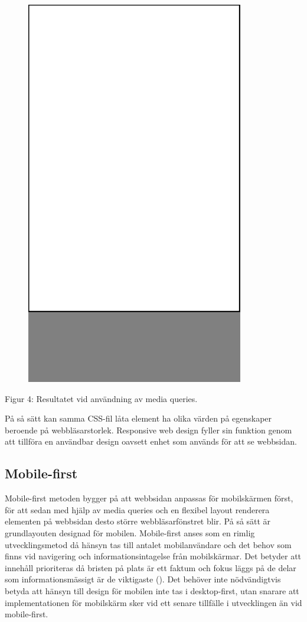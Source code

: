 \documentclass[11pt]{article}
\begin{document}
\vspace{1cm}
\begin{figure}[h]
\centerline{%
\includegraphics[scale=0.25]{pics/mobilesmall.png}
}
\end{figure}
\centerline{Figur 4: Resultatet vid användning av media queries.}
\vspace{0.5cm}

På så sätt kan samma CSS-fil låta element ha olika värden på egenskaper beroende på webbläsarstorlek. Responsive web design fyller sin funktion genom att tillföra en användbar design oavsett enhet som används för att se webbsidan. 
\newpage

\subsection{Mobile-first}
Mobile-first metoden bygger på att webbsidan anpassas för mobilskärmen först, för att sedan med hjälp av media queries och en flexibel layout renderera elementen på webbsidan desto större webbläsarfönstret blir.  På så sätt är grundlayouten designad för mobilen. Mobile-first anses som en rimlig utvecklingsmetod då hänsyn tas till antalet mobilanvändare och det behov som finns vid navigering och informationsintagelse från mobilskärmar.  Det betyder att innehåll prioriteras då bristen på plats är ett faktum och fokus läggs på de delar som informationsmässigt är de viktigaste (\cite{Mobilefirst}). Det behöver inte nödvändigtvis betyda att hänsyn till design för mobilen inte tas i desktop-first, utan snarare att implementationen för mobilskärm sker vid ett senare tillfälle i utvecklingen än vid mobile-first.
\end{document}
